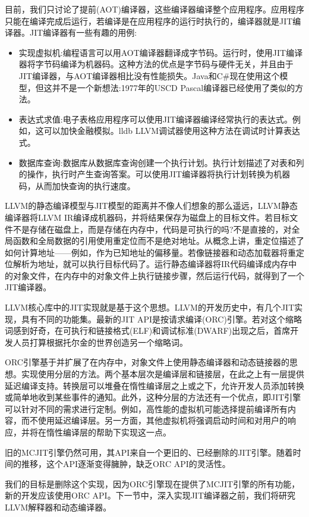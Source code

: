 
目前，我们只讨论了提前(AOT)编译器，这些编译器编译整个应用程序。应用程序只能在编译完成后运行，若编译是在应用程序的运行时执行的，编译器就是JIT编译器。JIT编译器有一些有趣的用例:

\begin{itemize}
\item
实现虚拟机:编程语言可以用AOT编译器翻译成字节码。运行时，使用JIT编译器将字节码编译为机器码。这种方法的优点是字节码与硬件无关，并且由于JIT编译器，与AOT编译器相比没有性能损失。Java和C\#现在使用这个模型，但这并不是一个新想法:1977年的USCD Pascal编译器已经使用了类似的方法。

\item
表达式求值:电子表格应用程序可以使用JIT编译器编译经常执行的表达式。例如，这可以加快金融模拟。lldb LLVM调试器使用这种方法在调试时计算表达式。

\item
数据库查询:数据库从数据库查询创建一个执行计划。执行计划描述了对表和列的操作，执行时产生查询答案。可以使用JIT编译器将执行计划转换为机器码，从而加快查询的执行速度。
\end{itemize}

LLVM的静态编译模型与JIT模型的距离并不像人们想象的那么遥远，LLVM静态编译器将LLVM IR编译成机器码，并将结果保存为磁盘上的目标文件。若目标文件不是存储在磁盘上，而是存储在内存中，代码是可执行的吗?不是直接的，对全局函数和全局数据的引用使用重定位而不是绝对地址。从概念上讲，重定位描述了如何计算地址——例如，作为已知地址的偏移量。若像链接器和动态加载器将重定位解析为地址，就可以执行目标代码了。运行静态编译器将IR代码编译成内存中的对象文件，在内存中的对象文件上执行链接步骤，然后运行代码，就得到了一个JIT编译器。

LLVM核心库中的JIT实现就是基于这个思想。LLVM的开发历史中，有几个JIT实现，具有不同的功能集。最新的JIT API是按请求编译(ORC)引擎。若对这个缩略词感到好奇，在可执行和链接格式(ELF)和调试标准(DWARF)出现之后，首席开发人员打算根据托尔金的世界创造另一个缩略词。

ORC引擎基于并扩展了在内存中，对象文件上使用静态编译器和动态链接器的思想。实现使用分层的方法。两个基本层次是编译层和链接层，在此之上有一层提供延迟编译支持。转换层可以堆叠在惰性编译层之上或之下，允许开发人员添加转换或简单地收到某些事件的通知。此外，这种分层的方法还有一个优点，即JIT引擎可以针对不同的需求进行定制。例如，高性能的虚拟机可能选择提前编译所有内容，而不使用延迟编译层。另一方面，其他虚拟机将强调启动时间和对用户的响应，并将在惰性编译层的帮助下实现这一点。

旧的MCJIT引擎仍然可用，其API来自一个更旧的、已经删除的JIT引擎。随着时间的推移，这个API逐渐变得臃肿，缺乏ORC API的灵活性。

我们的目标是删除这个实现，因为ORC引擎现在提供了MCJIT引擎的所有功能，新的开发应该使用ORC API。下一节中，深入实现JIT编译器之前，我们将研究LLVM解释器和动态编译器。








































